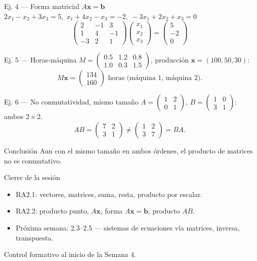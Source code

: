 \documentclass[11pt]{beamer}
\newcommand{\vv}[1]{\mathbf{#1}}
\begin{document}
\begin{frame}{Ej. 4 — Forma matricial \texorpdfstring{$A\vv{x}=\vv{b}$}{Ax=b}}
  $2x_1-x_2+3x_3=5,\; x_1+4x_2-x_3=-2,\; -3x_1+2x_2+x_3=0$
  \[
    \begin{pmatrix}2&-1&3\\1&4&-1\\-3&2&1\end{pmatrix}
    \begin{pmatrix}x_1\\x_2\\x_3\end{pmatrix} =
    \begin{pmatrix}5\\-2\\0\end{pmatrix}
  \]
\end{frame}

\begin{frame}{Ej. 5 — Horas-máquina}
  $M=\begin{pmatrix}0.5&1.2&0.8\\1.0&0.3&1.5\end{pmatrix}$, producción
  $\vv{x}=(100,50,30)$:
  \[
    M\vv{x} = \begin{pmatrix}134\\160\end{pmatrix} \text{ horas (máquina 1, máquina 2).}
  \]
\end{frame}

\begin{frame}{Ej. 6 — No conmutatividad, mismo tamaño}
  $A=\begin{pmatrix}1&2\\0&1\end{pmatrix}$, $B=\begin{pmatrix}1&0\\3&1\end{pmatrix}$: ambos
  $2\times 2$.
  \[
    AB=\begin{pmatrix}7&2\\3&1\end{pmatrix} \neq \begin{pmatrix}1&2\\3&7\end{pmatrix}=BA.
  \]
  \begin{block}{Conclusión}
    Aun con el mismo tamaño en ambos órdenes, el producto de matrices no es conmutativo.
  \end{block}
\end{frame}

\begin{frame}{Cierre de la sesión}
  \begin{itemize}
    \item RA2.1: vectores, matrices, suma, resta, producto por escalar.
    \item RA2.2: producto punto, $A\vv{x}$, forma $A\vv{x}=\vv{b}$, producto $AB$.
    \item Próxima semana: 2.3--2.5 --- sistemas de ecuaciones vía matrices, inversa, transpuesta.
  \end{itemize}
  \vfill
  \centering \Large Control formativo al inicio de la Semana 4.
\end{frame}
\end{document}
